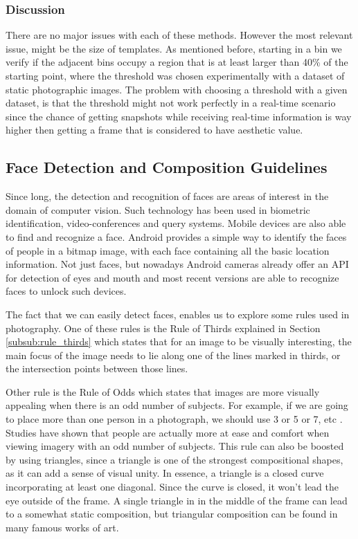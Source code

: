 \subsubsection{Discussion}

There are no major issues with each of these methods. However the most relevant issue, might be the size of templates. As mentioned before, starting in a bin we verify if the adjacent bins occupy a region that is at least larger than 40\% of the starting point, where the threshold was chosen experimentally with a dataset of static photographic images. The problem with choosing a threshold with a given dataset, is that the threshold might not work perfectly in a real-time scenario since the chance of getting snapshots while receiving real-time information is way higher then getting a frame that is considered to have aesthetic value.

\subsection{Face Detection and Composition Guidelines}
\label{sub:face_guidelines}

Since long, the detection and recognition of faces are areas of interest in the domain of computer vision. Such technology has been used in biometric identification, video-conferences and query systems.
Mobile devices are also able to find and recognize a face. Android provides a simple way to identify the faces of people in a bitmap image, with each face containing all the basic location information. Not just faces, but nowadays Android cameras already offer an API for detection of eyes and mouth and most recent versions are able to recognize faces to unlock such devices.

The fact that we can easily detect faces, enables us to explore some rules used in photography. One of these rules is the Rule of Thirds explained in Section \ref{subsub:rule_thirds} which states that for an image to be visually interesting, the main focus of the image needs to lie along one of the lines marked in thirds, or the intersection points between those lines\cite{kamps2012rules}.

Other rule is the Rule of Odds which states that images are more visually appealing when there is an odd number of subjects. For example, if we are going to place more than one person in a photograph, we should use 3 or 5 or 7, etc \cite{kamps2012rules}. Studies have shown that people are actually more at ease and comfort when viewing imagery with an odd number of subjects. This rule can also be boosted by using triangles, since a triangle is one of the strongest compositional shapes, as it can add a sense of visual unity. In essence, a triangle is a closed curve incorporating at least one diagonal. Since the curve is closed, it won't lead the eye outside of the frame. A single triangle in in the middle of the frame can lead to a somewhat static composition, but triangular composition can be found in many famous works of art.

